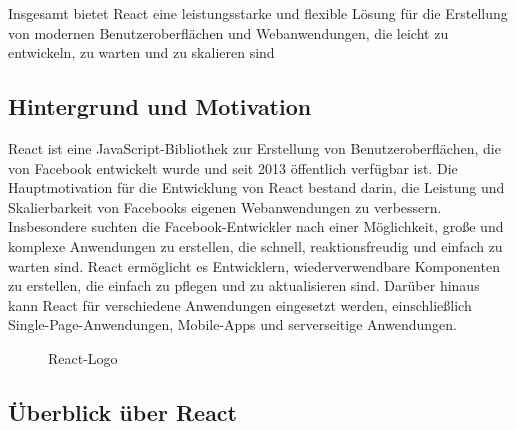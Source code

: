 Insgesamt bietet React eine leistungsstarke und flexible Lösung für die Erstellung von modernen Benutzeroberflächen und Webanwendungen, die leicht zu entwickeln, zu warten und zu skalieren sind
\subsection{Hintergrund und Motivation}
React ist eine JavaScript-Bibliothek zur Erstellung von Benutzeroberflächen, die von Facebook entwickelt wurde und seit 2013 öffentlich verfügbar ist.\cite{ReactGettingStarted} Die Hauptmotivation für die Entwicklung von React bestand darin, die Leistung und Skalierbarkeit von Facebooks eigenen Webanwendungen zu verbessern. Insbesondere suchten die Facebook-Entwickler nach einer Möglichkeit, große und komplexe Anwendungen zu erstellen, die schnell, reaktionsfreudig und einfach zu warten sind. React ermöglicht es Entwicklern, wiederverwendbare Komponenten zu erstellen, die einfach zu pflegen und zu aktualisieren sind. Darüber hinaus kann React für verschiedene Anwendungen eingesetzt werden, einschließlich Single-Page-Anwendungen, Mobile-Apps und serverseitige Anwendungen.

\begin{figure}[htbp]
	\centering
	\caption{React-Logo}
\end{figure}

\subsection{Überblick über React}

